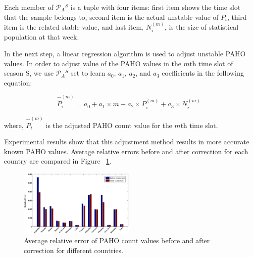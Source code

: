 Each member of $\mathcal{P}_A{^S}$ is a tuple with four items: first item shows the time slot that the sample belongs to, second item is the actual unstable value of $P_i$, third item is the related stable value, and last item, $N_i^{(m)}$, is the size of statistical population at that week.

In the next step, a linear regression algorithm is used to adjust unstable PAHO values. In order to adjust value of the PAHO values in the $m$th time slot of season S, we use $\mathcal{P}_A{^S}$ set to learn $a_0$, $a_1$, $a_2$, and $a_3$ coefficients in the following equation:

\begin{equation}
\hat{\dot{P}}_i^{(m)} = a_0 + a_1 \times m + a_2 \times P_i^{(m)} + a_3 \times N_i^{(m)}
\end{equation}

where, $\hat{\dot{P}}_i^{(m)}$ is the adjusted PAHO count value for the $m$th time slot.

Experimental results show that this adjustment method results in more accurate known PAHO values. Average relative errors before and after correction for each country are compared in Figure ~\ref{fig:avgrelerrors}.


\begin{figure}[h]
  \centering
    \includegraphics[width=0.5\textwidth]{fig/errs.eps}
  \caption{Average relative error of PAHO count values before and after correction for different countries.}
  \label{fig:avgrelerrors}
\end{figure}
